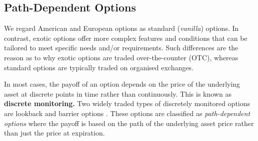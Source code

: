 \documentclass[a4paper]{report}
\begin{document}
\subsection{Path-Dependent Options}\label{section:discrete_monitoring}
We regard American and European options as standard (\textit{vanilla}) options. In contrast, exotic options offer more complex features and conditions that can be tailored to meet specific needs and/or requirements. Such differences are the reason as to why exotic options are traded over-the-counter (OTC)\footnotemark[1], whereas standard options are typically traded on organised exchanges\footnotemark[2]. 


In most cases, the payoff of an option depends on the price of the underlying asset at discrete points in time rather than continuously. This is known as \textbf{discrete monitoring.} Two widely traded types of discretely monitored options are lookback and barrier options \citep{dadachanji2015fx}. These options are classified as \textit{path-dependent options} where the payoff is based on the path of the underlying asset price rather than just the price at expiration.
\end{document}
